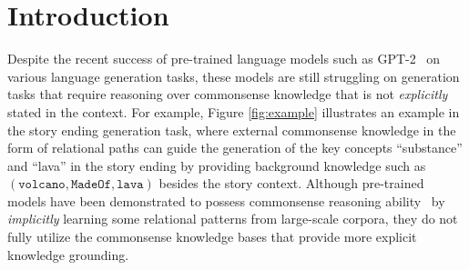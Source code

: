 \documentclass[11pt,a4paper]{article}
\begin{document}
\section{Introduction}
Despite the recent success of pre-trained language models such as GPT-2~\citep{Radford2019LanguageMA} on various language generation tasks, these models are still struggling on generation tasks that require reasoning over commonsense knowledge that is not \textit{explicitly} stated in the context. 
For example, Figure \ref{fig:example} illustrates an example in the story ending generation task, where external commonsense knowledge in the form of relational paths %
can guide the generation of the key concepts ``substance'' and ``lava'' in the story ending by providing background knowledge such as $(\texttt{volcano}, \texttt{MadeOf}, \texttt{lava})$ besides the story context. Although pre-trained models have been demonstrated to 
possess commonsense 
reasoning ability~\citep{Trinh2018ASM} by \textit{implicitly} learning some relational patterns from large-scale corpora, they do not fully utilize the commonsense knowledge bases that provide more explicit knowledge grounding.


\end{document}
